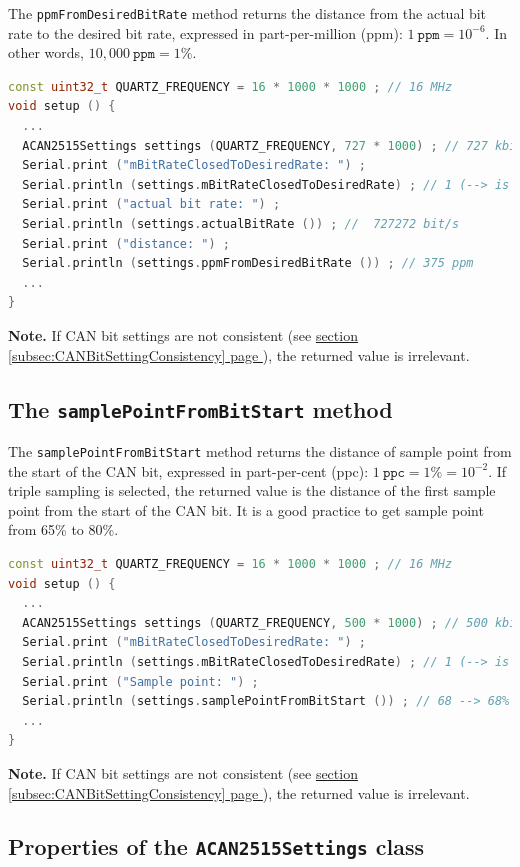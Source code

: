 \documentclass[10pt, a4paper, obeyspaces, openany]{extarticle}
\newcommand \subsectionLabel[2]{\subsection{#1}\label{subsec:#2}}
\newcommand\refSubsectionPage[1]{\hyperref[subsec:#1]{section \ref*{subsec:#1} page \pageref{subsec:#1}}}
\begin{document}
The \texttt{ppmFromDesiredBitRate} method returns the distance from the actual bit rate to the desired bit rate, expressed in part-per-million (ppm): $1~\texttt{ppm} = 10^{-6}$. In other words, $10,000~\texttt{ppm}=1\%$.

{ \small\begin{lstlisting}[language=c++]
const uint32_t QUARTZ_FREQUENCY = 16 * 1000 * 1000 ; // 16 MHz
void setup () {
  ...
  ACAN2515Settings settings (QUARTZ_FREQUENCY, 727 * 1000) ; // 727 kbit/s
  Serial.print ("mBitRateClosedToDesiredRate: ") ;
  Serial.println (settings.mBitRateClosedToDesiredRate) ; // 1 (--> is true)
  Serial.print ("actual bit rate: ") ;
  Serial.println (settings.actualBitRate ()) ; //  727272 bit/s
  Serial.print ("distance: ") ;
  Serial.println (settings.ppmFromDesiredBitRate ()) ; // 375 ppm
  ...
}
\end{lstlisting}}

{\bf Note. } If CAN bit settings are not consistent (see \refSubsectionPage{CANBitSettingConsistency}), the returned value is irrelevant.






\subsectionLabel{The \texttt{samplePointFromBitStart} method}{samplePointFromBitStart}


The \texttt{samplePointFromBitStart} method returns the distance of sample point from the start of the CAN bit, expressed in part-per-cent (ppc): $1~\texttt{ppc} = 1\% = 10^{-2}$. If triple sampling is selected, the returned value is the distance of the first sample point from the start of the CAN bit. It is a good practice to get sample point from 65\% to 80\%.

{ \small\begin{lstlisting}[language=c++]
const uint32_t QUARTZ_FREQUENCY = 16 * 1000 * 1000 ; // 16 MHz
void setup () {
  ...
  ACAN2515Settings settings (QUARTZ_FREQUENCY, 500 * 1000) ; // 500 kbit/s
  Serial.print ("mBitRateClosedToDesiredRate: ") ;
  Serial.println (settings.mBitRateClosedToDesiredRate) ; // 1 (--> is true)
  Serial.print ("Sample point: ") ;
  Serial.println (settings.samplePointFromBitStart ()) ; // 68 --> 68%
  ...
}
\end{lstlisting}}

{\bf Note. } If CAN bit settings are not consistent (see \refSubsectionPage{CANBitSettingConsistency}), the returned value is irrelevant.






\subsectionLabel{Properties of the \texttt{ACAN2515Settings} class}{propertiesACAN2515Settings}
\end{document}
